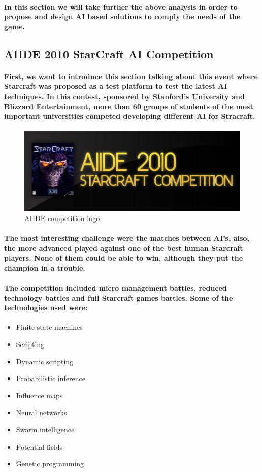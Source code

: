 \documentclass[a4paper,10pt]{article}
\newcommand{\p}[1]{\paragraph{\indent\textnormal{#1}}}
\begin{document}
    \p{In this section we will take further the above analysis in order to propose and design AI based solutions to comply the needs of the game.}

    \subsection{AIIDE 2010 StarCraft AI Competition}

      \p{First, we want to introduce this section talking about this event where Starcraft was proposed as a test platform to test the latest AI techniques. In this contest, sponsored by Stanford's University and Blizzard Entertainment, more than 60 groups of students of the most important universities competed developing different AI for Stracraft.}
  \begin{figure}[hbt]
  \begin{center}
  \includegraphics[scale=.5]{diapos1/aide.png}
  \end{center}
  \caption{AIIDE competition logo.}
  \label{fig:aiide}
  \end{figure}
      \p{The most interesting challenge were the matches between AI's, also, the more advanced played against one of the best human Starcraft players. None of them could be able to win, although they put the champion in a trouble.}

      \p{The competition included micro management battles, reduced technology battles and full Starcraft games battles. Some of the technologies used were:}

      \begin{itemize}
       \item Finite state machines
       \item Scripting
       \item Dynamic scripting
       \item Probabilistic inference
       \item Influence maps
       \item Neural networks
       \item Swarm intelligence
       \item Potential fields
       \item Genetic programming
      \end{itemize}
\end{document}
